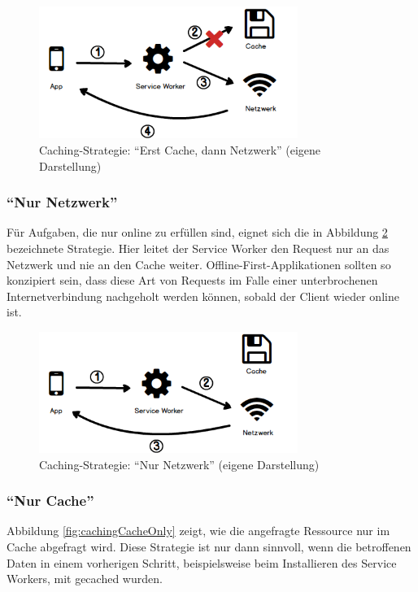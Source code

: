 \documentclass[a4paper, 12pt]{scrreprt}
\begin{document}
\begin{figure}[H]
	\centering
	\includegraphics[width=0.75\textwidth]{cachefirst.png}
	\caption[Caching-Strategie: \enquote{Erst Cache, dann Netzwerk}]{Caching-Strategie: \enquote{Erst Cache, dann Netzwerk} (eigene Darstellung)}
	\label{fig:cachingCacheFirst}
\end{figure}

\subsubsection{\enquote{Nur Netzwerk}}
Für Aufgaben, die nur online zu erfüllen sind, eignet sich die in Abbildung \ref{fig:cachingNetworkOnly} bezeichnete Strategie. Hier leitet der Service Worker den Request nur an das Netzwerk und nie an den Cache weiter. Offline-First-Applikationen sollten so konzipiert sein, dass diese Art von Requests im Falle einer unterbrochenen Internetverbindung nachgeholt werden können, sobald der Client wieder online ist.

\begin{figure}[H]
	\centering
	\includegraphics[width=0.75\textwidth]{networkonly.png}
	\caption[Caching-Strategie: \enquote{Nur Netzwerk}]{Caching-Strategie: \enquote{Nur Netzwerk} (eigene Darstellung)}
	\label{fig:cachingNetworkOnly}
\end{figure}

\subsubsection{\enquote{Nur Cache}}
Abbildung \ref{fig:cachingCacheOnly} zeigt, wie die angefragte Ressource nur im Cache abgefragt wird. Diese Strategie ist nur dann sinnvoll, wenn die betroffenen Daten in einem vorherigen Schritt, beispielsweise beim Installieren des Service Workers, mit gecached wurden.
\end{document}
